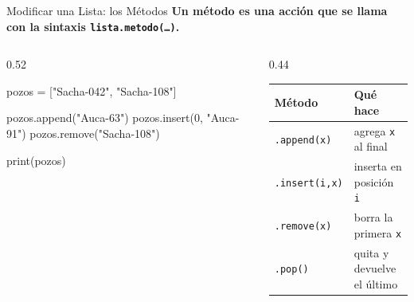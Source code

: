 \documentclass[aspectratio=169, 11pt]{beamer}
\begin{document}
\begin{frame}[fragile,shrink=10]{Modificar una Lista: los Métodos}
  \vspace{-4pt}
  {\small\color{arcaDark}\bfseries
    Un \textbf{método} es una acción que se llama con la sintaxis \texttt{lista.metodo(\ldots)}.}

  \vspace{5pt}
  \begin{columns}[T]
    \begin{column}{0.52\textwidth}
      \begin{pyblock}
pozos = ["Sacha-042", "Sacha-108"]

pozos.append("Auca-63")
pozos.insert(0, "Auca-91")
pozos.remove("Sacha-108")

print(pozos)
      \end{pyblock}
      \vspace{2pt}
      \begin{outputblock}
      \end{outputblock}
    \end{column}

    \begin{column}{0.44\textwidth}
      {\scriptsize
      \renewcommand{\arraystretch}{1.35}
      \begin{tabular}{@{}l l@{}}
        \toprule
        {\bfseries\color{arcaRed} Método} & {\bfseries\color{arcaDark} Qué hace} \\
        \midrule
        \texttt{.append(x)} & agrega \texttt{x} al final \\
        \texttt{.insert(i,x)} & inserta en posición \texttt{i} \\
        \texttt{.remove(x)} & borra la primera \texttt{x} \\
        \texttt{.pop()} & quita y devuelve el último \\
        \bottomrule
      \end{tabular}
      }
    \end{column}
  \end{columns}
\end{frame}
\end{document}
